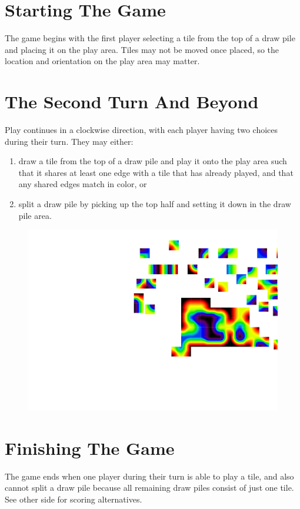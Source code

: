 \documentclass[twocolumn, 12pt]{article}
\begin{document}
\section*{Starting The Game}
The game begins with the first player selecting a tile from the top of
a draw pile and placing it on the play area.  Tiles may not be moved
once placed, so the location and orientation on the play area may
matter.
\section*{The Second Turn And Beyond}
Play continues in a clockwise direction, with each player having two
choices during their turn.  They may either:
\begin{enumerate}
\item draw a tile from the top of a draw pile and play it onto the play area such that it shares at least one edge with a tile that has already played, and that any shared edges match in color,
or
\item split a draw pile by picking up the top half and setting it down
  in the draw pile area.
\end{enumerate}
\begin{figure}[h]
  \includegraphics[width=\columnwidth]{play-example}
\end{figure}
\section*{Finishing The Game}
The game ends when one player during their turn is able to play a
tile, and also cannot split a draw pile because all remaining draw
piles consist of just one tile.  See other side for scoring
alternatives.
\end{document}
